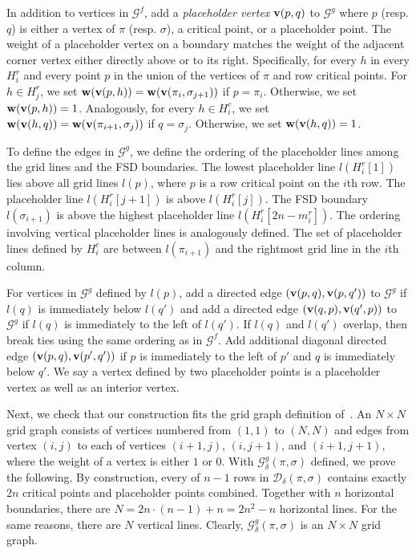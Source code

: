 \documentclass[thm-restate]{lipics-v2021}
\theoremstyle{remark}
\newcommand{\weight}[1]{\normalfont \textbf{w}(#1)}
\newcommand{\graph}[0]{\mathcal{G}}
\newcommand{\fd}[2]{\mathcal{D}_{#2}(#1)}
\newcommand{\vertex}[1]{\normalfont \textbf{v}(#1)}
\newcommand{\fsgraph}[0]{\graph^{f}}
\newcommand{\ggraph}[0]{\graph^g}
\begin{document}
In addition to vertices in $\fsgraph$, add a \emph{placeholder vertex} $\vertex{p, q}$ to $\ggraph$ where $p$ (resp. $q$) is either a vertex of $\pi$ (resp. $\sigma$), a critical point, or a placeholder point. The weight of a placeholder vertex on a boundary matches the weight of the adjacent corner vertex either directly above or to its right. Specifically, for every $h$ in every $H^r_i$ and every point $p$ in the union of the vertices of $\pi$ and row critical points. For $h \in H^r_j$, we set $\weight{\vertex{p, h}} = \weight{\vertex{\pi_i, \sigma_{j + 1}}}$ if $p = \pi_i$. Otherwise, we set $\weight{\vertex{p, h}} = 1$. Analogously, for every $h \in H^c_i$, we set $\weight{\vertex{h, q}} = \weight{\vertex{\pi_{i + 1}, \sigma_j}}$ if $q = \sigma_j$. Otherwise, we set $\weight{\vertex{h, q}} = 1$. 

To define the edges in $\ggraph$, we define the ordering of the placeholder lines among the grid lines and the FSD boundaries. The lowest placeholder line $l(H^r_i[1])$ lies above all grid lines $l(p)$, where $p$ is a row critical point on the $i$th row. The placeholder line $l(H^r_i[j + 1])$ is above $l(H^r_i[j])$. The FSD boundary $l(\sigma_{i + 1})$ is above the highest placeholder line $l(H^r_i[2n - m_i^r])$. The ordering involving vertical placeholder lines is analogously defined. The set of placeholder lines defined by $H^c_i$ are between $l(\pi_{i + 1})$ and the rightmost grid line in the $i$th column. 

For vertices in $\ggraph$ defined by $l(p)$, add a directed edge $(\vertex{p, q}, \vertex{p, q'})$ to $\ggraph$ if $l(q)$ is immediately below $l(q')$ and add a directed edge $(\vertex{q, p}, \vertex{q', p})$ to $\ggraph$ if $l(q)$ is immediately to the left of $l(q')$. If $l(q)$ and $l(q')$ overlap, then break ties using the same ordering as in $\fsgraph$. Add additional diagonal directed edge $(\vertex{p, q}, \vertex{p', q'})$ if $p$ is immediately to the left of $p'$ and $q$ is immediately below $q'$. We say a vertex defined by two placeholder points is a placeholder vertex as well as an interior vertex. 

Next, we check that our construction fits the grid graph definition of~\cite{bringmannFrechetDistanceTranslation2021}. An $N \times N$ grid graph consists of vertices numbered from $(1, 1)$ to $(N, N)$ and edges from vertex $(i, j)$ to each of vertices $(i + 1, j)$, $(i, j + 1)$, and $(i + 1, j + 1)$, where the weight of a vertex is either $1$ or $0$. With $\ggraph_{\delta}(\pi, \sigma)$ defined, we prove the following. By construction, every of $n - 1$ rows in $\fd{\pi, \sigma}{\delta}$ contains exactly $2n$ critical points and placeholder points combined. Together with $n$ horizontal boundaries, there are $N = 2n \cdot (n - 1) + n = 2n^2 - n$ horizontal lines. For the same reasons, there are $N$ vertical lines. Clearly, $\ggraph_{\delta}(\pi, \sigma)$ is an $N \times N$ grid graph. 
\end{document}
